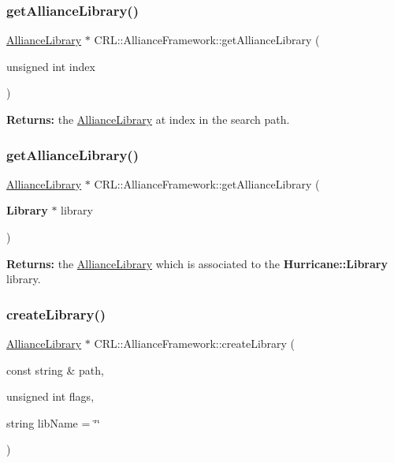\subsubsection{\texorpdfstring{get\+Alliance\+Library()}{getAllianceLibrary()}\hspace{0.1cm}{\footnotesize\ttfamily [1/2]}}
{\footnotesize\ttfamily \mbox{\hyperlink{classCRL_1_1AllianceLibrary}{Alliance\+Library}} $\ast$ C\+R\+L\+::\+Alliance\+Framework\+::get\+Alliance\+Library (\begin{DoxyParamCaption}\item[{unsigned int}]{index }\end{DoxyParamCaption})}

{\bfseries Returns\+:} the \mbox{\hyperlink{classCRL_1_1AllianceLibrary}{Alliance\+Library}} at {\ttfamily index} in the search path. \mbox{\label{classCRL_1_1AllianceFramework_a8e007b3f2ac45feec2907f77530a718c}} 
\subsubsection{\texorpdfstring{get\+Alliance\+Library()}{getAllianceLibrary()}\hspace{0.1cm}{\footnotesize\ttfamily [2/2]}}
{\footnotesize\ttfamily \mbox{\hyperlink{classCRL_1_1AllianceLibrary}{Alliance\+Library}} $\ast$ C\+R\+L\+::\+Alliance\+Framework\+::get\+Alliance\+Library (\begin{DoxyParamCaption}\item[{\textbf{ Library} $\ast$}]{library }\end{DoxyParamCaption})}

{\bfseries Returns\+:} the \mbox{\hyperlink{classCRL_1_1AllianceLibrary}{Alliance\+Library}} which is associated to the \textbf{ Hurricane\+::\+Library} {\ttfamily library}. \mbox{\label{classCRL_1_1AllianceFramework_a4efc06e6a6d5413398946453c3fd6649}} 
\subsubsection{\texorpdfstring{create\+Library()}{createLibrary()}}
{\footnotesize\ttfamily \mbox{\hyperlink{classCRL_1_1AllianceLibrary}{Alliance\+Library}} $\ast$ C\+R\+L\+::\+Alliance\+Framework\+::create\+Library (\begin{DoxyParamCaption}\item[{const string \&}]{path,  }\item[{unsigned int}]{flags,  }\item[{string}]{lib\+Name = {\ttfamily \char`\"{}\char`\"{}} }\end{DoxyParamCaption})}


